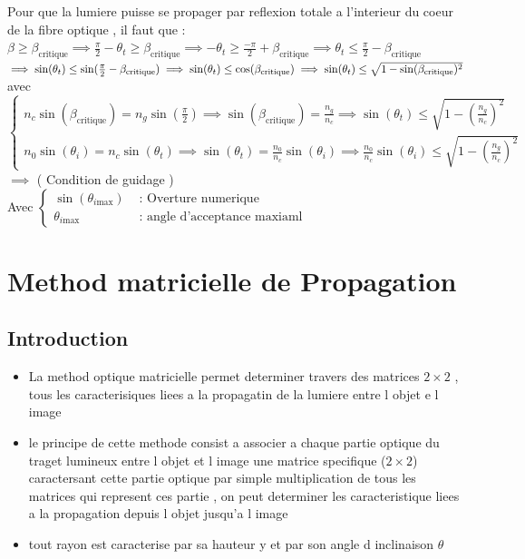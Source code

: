 \documentclass[12pt]{book}
\begin{document}
            Pour que la lumiere puisse se propager par reflexion totale a l'interieur du coeur de la fibre optique , il faut que :\\
            $ \beta \geq \beta_{\text{critique}} \implies \frac{\pi}{2}-\theta_t \geq \beta_{\text{critique}} \implies -\theta_t \geq \frac{-\pi}{2} +\beta_{\text{critique}} \implies \theta_t \leq \frac{\pi}{2}-\beta_{\text{critique}}$\\
            $ \implies \sin(\theta_t) \leq \sin(\frac{\pi}{2} - \beta_{\text{critique}}) \implies \sin(\theta_t)\leq\cos(\beta_{\text{critique}}) \\
            \implies \sin(\theta_t)\leq\sqrt{1-\sin(\beta_{\text{critique}})^2}$ \\
            avec $ \begin{cases}
                n_c\sin(\beta_{\text{critique}}) = n_g\sin(\frac{\pi}{2})\implies \sin(\beta_{\text{critique}})=\frac{n_g}{n_c}\implies \sin(\theta_t)\leq\sqrt{1-(\frac{n_g}{n_c})^2}\\
                n_0\sin(\theta_i)=n_c\sin(\theta_t)\implies \sin(\theta_t) = \frac{n_0}{n_c}\sin(\theta_i)\implies \frac{n_0}{n_c}\sin(\theta_i)\leq\sqrt{1-(\frac{n_g}{n_c})^2}
            \end{cases}$ \\
            $ \implies$   ( Condition de guidage ) \\
            Avec $ \begin{cases}
                \sin(\theta_{i\text{max}}) &\text{ : Overture numerique} \\
                \theta_{i\text{max}} & \text{ : angle d'acceptance maxiaml} 
            \end{cases} $
            


    \chapter{Method matricielle de Propagation }
        \section{Introduction}
            \begin{itemize}
                \item La method optique matricielle permet determiner travers des matrices $2 \times 2$ , tous les caracterisiques liees a la propagatin de la lumiere entre l objet e l image
                \item le principe de cette methode consist a associer a chaque partie optique du traget lumineux entre l objet et l image une matrice specifique ($2 \times 2$) caractersant cette partie optique par simple multiplication de tous les matrices qui represent ces partie , on peut determiner les caracteristique liees a la propagation depuis l objet jusqu'a l image 
                \item tout rayon est caracterise par sa hauteur y et par son angle d inclinaison $\theta$ 
                  
            \end{itemize}
\end{document}
